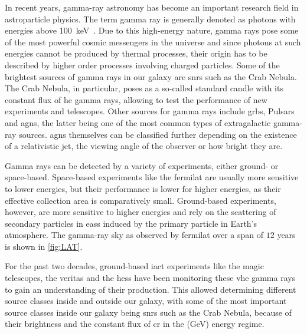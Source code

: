 In recent years, gamma-ray astronomy has become an important research field in astroparticle physics.
The term gamma ray is generally denoted as photons with energies above \SI{100}{\kilo\eV}~\cite{funk}.
Due to this high-energy nature, gamma rays pose some of the most powerful cosmic messengers in
the universe and since photons at such energies cannot be produced by thermal processes, their origin
has to be described by higher order processes involving charged particles.
Some of the brightest sources of gamma rays in our galaxy are \glspl{snr} such as the Crab Nebula.
The Crab Nebula, in particular, poses as a so-called standard candle with its constant flux of
\gls{he} gamma rays, allowing to test the performance of new experiments and telescopes. Other sources for
gamma rays include \glspl{grb}, Pulsars and \glspl{agn}, the latter being one of the most common types
of extragalactic gamma-ray sources.
\glspl{agn} themselves can be classified further depending on the existence
of a relativistic jet, the viewing angle of the observer or how bright they are.

Gamma rays can be detected by a variety of experiments, either ground- or space-based. Space-based
experiments like the \gls{fermilat} are usually more sensitive to lower energies, but their performance
is lower for higher energies, as their effective collection area is comparatively small. Ground-based
experiments, however, are more sensitive to higher energies and rely on the scattering
of secondary particles in \glspl{eas} induced by the primary particle in Earth's atmosphere.
The gamma-ray sky as observed by \gls{fermilat} over a span of
\(\num{12}\) years is shown in \autoref{fig:LAT}.

For the past two decades, ground-based \gls{iact} experiments like the \gls{magic} telescopes, the
\gls{veritas} and the \gls{hess} have been monitoring these \gls{vhe} gamma rays to gain an understanding of
their production. This allowed determining different source classes inside and outside our galaxy,
with some of the most important source classes inside our galaxy being \glspl{snr} such as the Crab Nebula,
because of their brightness and the constant flux of \gls{cr} in the (\si{\giga\eV}) energy regime.





